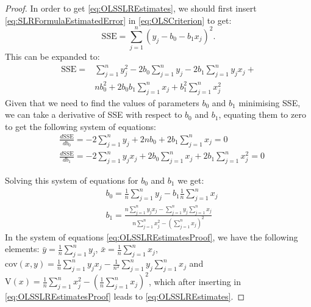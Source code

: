 \documentclass[
]{book}
\theoremstyle{definition}
\theoremstyle{definition}
\theoremstyle{definition}
\theoremstyle{definition}
\theoremstyle{remark}
\begin{document}
\begin{proof}
In order to get \eqref{eq:OLSSLREstimates}, we should first insert \eqref{eq:SLRFormulaEstimatedError} in \eqref{eq:OLSCriterion} to get:
\begin{equation*}
    \mathrm{SSE} = \sum_{j=1}^n (y_j - {b}_0 - {b}_1 x_j)^2 .
\end{equation*}
This can be expanded to:
\begin{equation*}
    \begin{aligned}
        \mathrm{SSE} = & \sum_{j=1}^n y_j^2 - 2 b_0 \sum_{j=1}^n y_j - 2 b_1 \sum_{j=1}^n y_j x_j + \\
                       & n b_0^2 + 2 b_0 b_1 \sum_{j=1}^n x_j + b_1^2 \sum_{j=1}^n x_j^2
    \end{aligned}
\end{equation*}
Given that we need to find the values of parameters \(b_0\) and \(b_1\) minimising SSE, we can take a derivative of SSE with respect to \(b_0\) and \(b_1\), equating them to zero to get the following system of equations:
\begin{equation*}
    \begin{aligned}
        & \frac{d \mathrm{SSE}}{d b_0} = -2 \sum_{j=1}^n y_j + 2 n b_0 + 2 b_1 \sum_{j=1}^n x_j = 0 \\
        & \frac{d \mathrm{SSE}}{d b_1} = -2 \sum_{j=1}^n y_j x_j  + 2 b_0 \sum_{j=1}^n x_j + 2 b_1 \sum_{j=1}^n x_j^2 = 0
    \end{aligned}
\end{equation*}

Solving this system of equations for \(b_0\) and \(b_1\) we get:
\begin{equation}
    \begin{aligned}
        & b_0 = \frac{1}{n}\sum_{j=1}^n y_j - b_1 \frac{1}{n}\sum_{j=1}^n x_j \\
        & b_1 = \frac{n \sum_{j=1}^n y_j x_j - \sum_{j=1}^n y_j \sum_{j=1}^n x_j}{n \sum_{j=1}^n x_j^2 - \left(\sum_{j=1}^n x_j \right)^2}
    \end{aligned}
    \label{eq:OLSSLREstimatesProof}
\end{equation}
In the system of equations \eqref{eq:OLSSLREstimatesProof}, we have the following elements: \(\bar{y}=\frac{1}{n}\sum_{j=1}^n y_j\), \(\bar{x}=\frac{1}{n}\sum_{j=1}^n x_j\), \(\mathrm{cov}(x,y) = \frac{1}{n}\sum_{j=1}^n y_j x_j - \frac{1}{n^2}\sum_{j=1}^n y_j \sum_{j=1}^n x_j\) and \(\mathrm{V}(x) = \frac{1}{n}\sum_{j=1}^n x_j^2 - \left(\frac{1}{n} \sum_{j=1}^n x_j \right)^2\), which after inserting in \eqref{eq:OLSSLREstimatesProof} leads to \eqref{eq:OLSSLREstimates}.
\end{proof}
\end{document}
